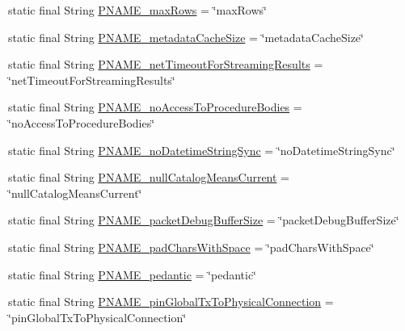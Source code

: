 \begin{DoxyCompactItemize}
\item 
static final String \mbox{\hyperlink{classcom_1_1mysql_1_1cj_1_1conf_1_1_property_definitions_a490f08f3dee8039a62123c57b64488b5}{P\+N\+A\+M\+E\+\_\+max\+Rows}} = \char`\"{}max\+Rows\char`\"{}
\item 
static final String \mbox{\hyperlink{classcom_1_1mysql_1_1cj_1_1conf_1_1_property_definitions_a5113a5969f5ac60dffa06189e5e741d9}{P\+N\+A\+M\+E\+\_\+metadata\+Cache\+Size}} = \char`\"{}metadata\+Cache\+Size\char`\"{}
\item 
static final String \mbox{\hyperlink{classcom_1_1mysql_1_1cj_1_1conf_1_1_property_definitions_a6e3ce12814920666c6e75dcf8c844544}{P\+N\+A\+M\+E\+\_\+net\+Timeout\+For\+Streaming\+Results}} = \char`\"{}net\+Timeout\+For\+Streaming\+Results\char`\"{}
\item 
static final String \mbox{\hyperlink{classcom_1_1mysql_1_1cj_1_1conf_1_1_property_definitions_a4b15a5d4e30785901513b2cae7f7b25c}{P\+N\+A\+M\+E\+\_\+no\+Access\+To\+Procedure\+Bodies}} = \char`\"{}no\+Access\+To\+Procedure\+Bodies\char`\"{}
\item 
static final String \mbox{\hyperlink{classcom_1_1mysql_1_1cj_1_1conf_1_1_property_definitions_a2e3187e5c08d67d411c2852bffdd2d44}{P\+N\+A\+M\+E\+\_\+no\+Datetime\+String\+Sync}} = \char`\"{}no\+Datetime\+String\+Sync\char`\"{}
\item 
static final String \mbox{\hyperlink{classcom_1_1mysql_1_1cj_1_1conf_1_1_property_definitions_afb27e8fdd2247297cb2285ded249d52e}{P\+N\+A\+M\+E\+\_\+null\+Catalog\+Means\+Current}} = \char`\"{}null\+Catalog\+Means\+Current\char`\"{}
\item 
static final String \mbox{\hyperlink{classcom_1_1mysql_1_1cj_1_1conf_1_1_property_definitions_ad7222e6c35b0eb5c7afd50b56c418e27}{P\+N\+A\+M\+E\+\_\+packet\+Debug\+Buffer\+Size}} = \char`\"{}packet\+Debug\+Buffer\+Size\char`\"{}
\item 
static final String \mbox{\hyperlink{classcom_1_1mysql_1_1cj_1_1conf_1_1_property_definitions_a5d2ad9e905e4d9cfceddf9b8bbad59bf}{P\+N\+A\+M\+E\+\_\+pad\+Chars\+With\+Space}} = \char`\"{}pad\+Chars\+With\+Space\char`\"{}
\item 
static final String \mbox{\hyperlink{classcom_1_1mysql_1_1cj_1_1conf_1_1_property_definitions_a61a6d7faf744b5ac75499acf83033f48}{P\+N\+A\+M\+E\+\_\+pedantic}} = \char`\"{}pedantic\char`\"{}
\item 
static final String \mbox{\hyperlink{classcom_1_1mysql_1_1cj_1_1conf_1_1_property_definitions_ad3d84250f5b94fba3d991d8e5497061e}{P\+N\+A\+M\+E\+\_\+pin\+Global\+Tx\+To\+Physical\+Connection}} = \char`\"{}pin\+Global\+Tx\+To\+Physical\+Connection\char`\"{}

\end{DoxyCompactItemize}
